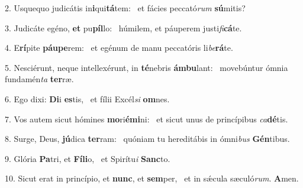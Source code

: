 2. Usquequo judicátis in\textbf{i}qui\textbf{tá}tem: \ast\  et fácies peccató\textit{rum} \textbf{sú}mitis?\

3. Judicáte egéno, \textbf{et} pu\textbf{píl}lo: \ast\  húmilem, et páuperem justi\textit{fi}\textbf{cá}te.\

4. E\textbf{rí}pite \textbf{páu}\textbf{pe}rem: \ast\  et egénum de manu peccatóris li\textit{be}\textbf{rá}te.\

5. Nesciérunt, neque intellexérunt, in \textbf{té}nebris \textbf{ám}\textbf{bu}lant: \ast\  movebúntur ómnia fundamén\textit{ta} \textbf{ter}ræ.\

6. Ego dixi: \textbf{Di}i \textbf{es}tis, \ast\  et fílii Excél\textit{si} \textbf{om}nes.\

7. Vos autem sicut hómines \textbf{mo}ri\textbf{é}\textbf{mi}ni: \ast\  et sicut unus de princípibus \textit{ca}\textbf{dé}tis.\

8. Surge, Deus, \textbf{jú}dica \textbf{ter}ram: \ast\  quóniam tu hereditábis in ómni\textit{bus} \textbf{Gén}tibus.\

9. Glória \textbf{Pa}tri, et \textbf{Fí}\textbf{li}o, \ast\  et Spirítu\textit{i} \textbf{Sanc}to.\

10. Sicut erat in princípio, et \textbf{nunc}, et \textbf{sem}per, \ast\  et in sǽcula sæculó\textit{rum}. \textbf{A}men.\

